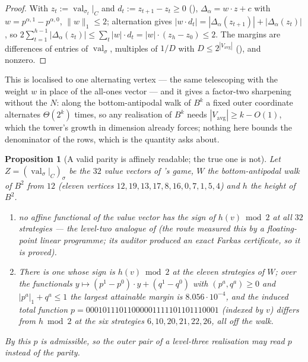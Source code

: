 \documentclass[11pt]{article}
\theoremstyle{plain}
\newtheorem{proposition}[theorem]{Proposition}
\theoremstyle{definition}
\DeclareMathOperator{\val}{val}
\newcommand{\Vavg}{V_{\mathrm{avg}}}
\begin{document}
\begin{proof}
With $z_t:=\val_{\sigma_t}|_C$ and $d_t:=z_{t+1}-z_t\ge0$
(), $\Delta_\alpha=w\cdot z+c$ with
$w=p^{\alpha,1}-p^{\alpha,0}$, $\|w\|_1\le2$; alternation gives
$|w\cdot d_t|=|\Delta_\alpha(z_{t+1})|+|\Delta_\alpha(z_t)|$, so
$2\sum_{t=1}^{h-1}|\Delta_\alpha(z_t)|\le\sum_t|w|\cdot d_t=|w|\cdot(z_h-z_0)\le2$.
The margins are differences of entries of $\val_\sigma$, multiples of
$1/D$ with $D\le2^{|\Vavg|}$ (), and nonzero.
\end{proof}

This is  localised to one alternating vertex ---
the same telescoping with the weight $w$ in place of the all-ones vector
--- and it gives a factor-two sharpening without the $N$: along the
bottom-antipodal walk of $B^{k}$ a fixed outer coordinate alternates
$\Theta(2^{k})$ times, so any realisation of $B^{k}$ needs
$|\Vavg|\ge k-O(1)$, which the tower's growth in dimension already
forces; nothing here bounds the denominator of the rows, which is the
quantity  asks about.


\begin{proposition}[A valid parity is affinely readable; the true one is not]\label{prop:parity-readable}
Let $Z=(\val_\sigma|_{C})_{\sigma}$ be the $32$ value vectors of
's game, $W$ the bottom-antipodal walk of $B^{2}$ from
$12$ (eleven vertices $12,19,13,17,8,16,0,7,1,5,4$) and $h$ the height of
$B^{2}$.
\begin{enumerate}[label=(\alph*),leftmargin=2.2em]
\item no affine functional of the value vector has the sign of
      $h(v)\bmod2$ at all $32$ strategies --- the level-two analogue of
       (the route measured this by a
      floating-point linear programme; its auditor produced an exact
      Farkas certificate, so it is proved).
\item There is one whose sign is $h(v)\bmod2$ at the eleven strategies of $W$;
      over the functionals $y\mapsto(p^{1}-p^{0})\cdot y+(q^{1}-q^{0})$ with
      $(p^{a},q^{a})\ge0$ and $|p^{a}|_1+q^{a}\le1$ the largest attainable
      margin is $8.056\cdot10^{-4}$, and the induced total function
      $p=00010111011000001111101101110001$ (indexed by $v$) differs from
      $h\bmod2$ at the six strategies $6,10,20,21,22,26$, all off the walk.
\end{enumerate}
By  this $p$ is admissible, so the outer pair of a
level-three realisation may read $p$ instead of the parity.
\end{proposition}
\end{document}
